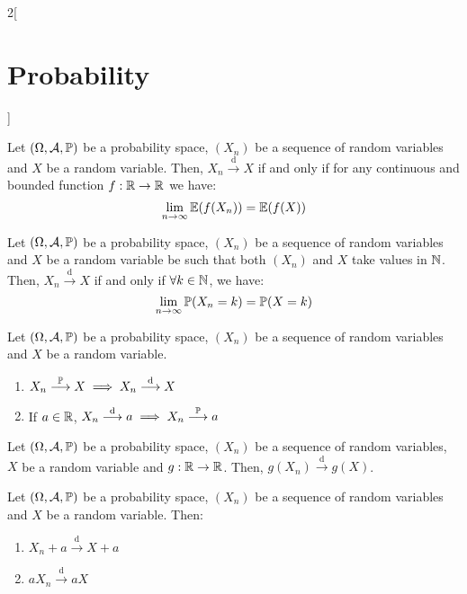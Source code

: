\documentclass[../../../main.tex]{subfiles}
\begin{document}
\begin{multicols}{2}[\section{Probability}]
\begin{theorem}
\begin{enumerate}
        \end{enumerate}
    \end{theorem}
    \begin{theorem}
        Let $(\Omega,\mathcal{A},\mathbb{P})$ be a probability space, $(X_n)$ be a sequence of random variables and $X$ be a random variable. Then, $X_n\overset{\text{d}}{\longrightarrow} X$ if and only if for any continuous and bounded function $f:\mathbb{R}\rightarrow\mathbb{R}$ we have: $$\lim_{n\to\infty}\mathbb{E}(f(X_n))=\mathbb{E}(f(X))$$
    \end{theorem}
    \begin{lemma}
        Let $(\Omega,\mathcal{A},\mathbb{P})$ be a probability space, $(X_n)$ be a sequence of random variables and $X$ be a random variable be such that both $(X_n)$ and $X$ take values in $\mathbb{N}$. Then, $X_n\overset{\text{d}}{\longrightarrow} X$ if and only if $\forall k\in\mathbb{N}$, we have: $$\lim_{n\to\infty} \mathbb{P}(X_n=k)=\mathbb{P}(X=k)$$
    \end{lemma}
    \begin{prop}
        Let $(\Omega,\mathcal{A},\mathbb{P})$ be a probability space, $(X_n)$ be a sequence of random variables and $X$ be a random variable.
        \begin{enumerate}
            \item $X_n\overset{\mathbb{P}}{\longrightarrow} X\implies X_n\overset{\text{d}}{\longrightarrow} X$
            \item If $a\in\mathbb{R}$, $X_n\overset{\text{d}}{\longrightarrow} a\implies X_n\overset{\mathbb{P}}{\longrightarrow} a$
        \end{enumerate}
    \end{prop}
    \begin{prop}
        Let $(\Omega,\mathcal{A},\mathbb{P})$ be a probability space, $(X_n)$ be a sequence of random variables, $X$ be a random variable and $g:\mathbb{R}\rightarrow\mathbb{R}$. Then, $g(X_n)\overset{\text{d}}{\longrightarrow}g(X)$.
    \end{prop}
    \begin{corollary}
        Let $(\Omega,\mathcal{A},\mathbb{P})$ be a probability space, $(X_n)$ be a sequence of random variables and $X$ be a random variable. Then:
        \begin{enumerate}
            \item $X_n+a\overset{\text{d}}{\longrightarrow}X+a$
            \item $aX_n\overset{\text{d}}{\longrightarrow}aX$
        \end{enumerate}
    \end{corollary}

\end{multicols}
\end{document}
